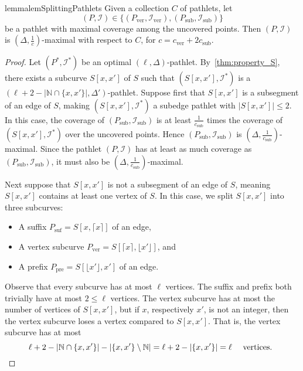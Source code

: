 \documentclass[a4paper,UKenglish,cleveref,thm-restate,notab]{lipics-v2021}
\newcommand{\N}{\mathbb{N}}
\newcommand{\I}{\mathcal{I}}
\newcommand{\ver}{\mathrm{ver}}
\newcommand{\pre}{\mathrm{pre}}
\newcommand{\suf}{\mathrm{suf}}
\newcommand{\sub}{\mathrm{sub}}
\newcommand{\floor}[1]{\lfloor#1\rfloor}
\newcommand{\ceil}[1]{\lceil#1\rceil}
\begin{document}
    \begin{restatable}{lemma}{lemSplittingPathlets}
    \label{lem:quality_of_pathlet}
        Given a collection $C$ of pathlets, let
        \[
            (P, \I) \in \{(P_\ver, \I_\ver), (P_\sub, \I_\sub)\}
        \]
        be a pathlet with maximal coverage among the uncovered points.
        Then $(P, \I)$ is $(\Delta, \frac{1}{c})$-maximal with respect to $C$, for $c = c_\ver + 2c_\sub$.
    \end{restatable}

    \begin{proof}
        Let $(P^*, \I^*)$ be an optimal $(\ell, \Delta)$-pathlet.
        By~\cref{thm:property_S}, there exists a subcurve $S[x, x']$ of $S$ such that $(S[x, x'], \I^*)$ is a $(\ell + 2 - |\N \cap \{x, x'\}|, \Delta')$-pathlet.
        Suppose first that $S[x, x']$ is a subsegment of an edge of $S$, making $(S[x, x'], \I^*)$ a subedge pathlet with $|S[x, x']| \leq 2$.
        In this case, the coverage of $(P_\sub, \I_\sub)$ is at least $\frac{1}{c_\sub}$ times the coverage of $(S[x, x'], \I^*)$ over the uncovered points.
        Hence $(P_\sub, \I_\sub)$ is $(\Delta, \frac{1}{c_\sub})$-maximal.
        Since the pathlet $(P, \I)$ has at least as much coverage as $(P_\sub, \I_\sub)$, it must also be $(\Delta, \frac{1}{c_\sub})$-maximal.

        Next suppose that $S[x, x']$ is not a subsegment of an edge of $S$, meaning $S[x, x']$ contains at least one vertex of $S$.
        In this case, we split $S[x, x']$ into three subcurves:
        \begin{itemize}
            \item A suffix $P_\suf = S[x, \ceil{x}]$ of an edge,
            \item A vertex subcurve $P_\ver = S[\ceil{x}, \floor{x'}]$, and
            \item A prefix $P_\pre = S[\floor{x'}, x']$ of an edge.
        \end{itemize}
        Observe that every subcurve has at most $\ell$ vertices.
        The suffix and prefix both trivially have at most $2 \leq \ell$ vertices.
        The vertex subcurve has at most the number of vertices of $S[x, x']$, but if $x$, respectively $x'$, is not an integer, then the vertex subcurve loses a vertex compared to $S[x, x']$.
        That is, the vertex subcurve has at most
        \[
            \ell + 2 - |\N \cap \{x, x'\}| - |\{x, x'\} \setminus \N| = \ell + 2 - |\{x, x'\}| = \ell \quad \textnormal{ vertices. }
        \]
        

\end{proof}
\end{document}

